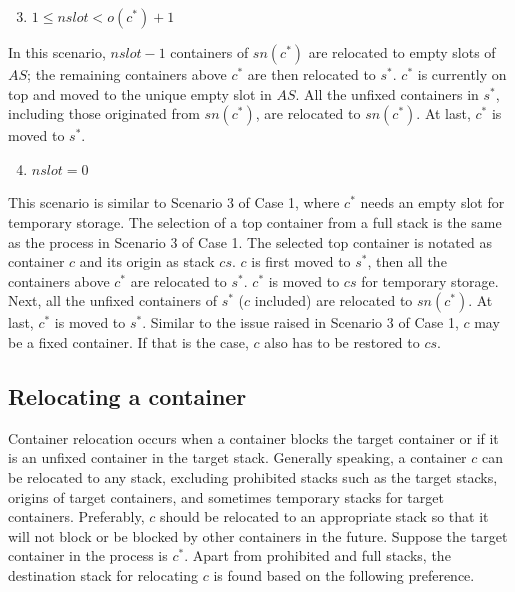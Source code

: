 \documentclass[review,3p,times,authoryear,12pt]{elsarticle}
\begin{document}
\begin{enumerate}
\setcounter{enumi}{2}
\item $1\le\mathit{nslot}< o(c^*)+1$
\end{enumerate}

In this scenario, $\mathit{nslot}-1$ containers of $\mathit{sn}(c^*)$ are relocated to empty slots of $\mathit{AS}$; the remaining containers above $c^*$ are then relocated to $s^*$. 
$c^*$ is currently on top and moved to the unique empty slot in $\mathit{AS}$. 
All the unfixed containers in $s^*$, including those originated from $\mathit{sn}(c^*)$, are relocated to $\mathit{sn}(c^*)$.
At last, $c^*$ is moved to $s^*$.

\begin{enumerate}
\setcounter{enumi}{3}
\item $\mathit{nslot}=0$
\end{enumerate}

This scenario is similar to Scenario 3 of Case 1, where $c^*$ needs an empty slot for temporary storage. 
The selection of a top container from a full stack is the same as the process in Scenario 3 of Case 1. 
The selected top container is notated as container $c$ and its origin as stack $\mathit{cs}$. 
$c$ is first moved to $s^*$, then all the containers above $c^*$ are relocated to $s^*$. 
$c^*$ is moved to $\mathit{cs}$ for temporary storage. 
Next, all the unfixed containers of $s^*$ ($c$ included) are relocated to $\mathit{sn}(c^*)$. 
At last, $c^*$ is moved to $s^*$. 
Similar to the issue raised in Scenario 3 of Case 1, $c$ may be a fixed container. 
If that is the case, $c$ also has to be restored to $\mathit{cs}$.


\subsection{Relocating a container}
\label{sec:rel}

Container relocation occurs when a container blocks the target container or if it is an unfixed container in the target stack. 
Generally speaking, a container $c$ can be relocated to any stack, excluding prohibited stacks such as the target stacks, origins of target containers, and sometimes temporary stacks for target containers.
Preferably, $c$ should be relocated to an appropriate stack so that it will not block or be blocked by other containers in the future. 
Suppose the target container in the process is $c^*$. 
Apart from prohibited and full stacks, the destination stack for relocating $c$ is found based on the following preference.
\end{document}
